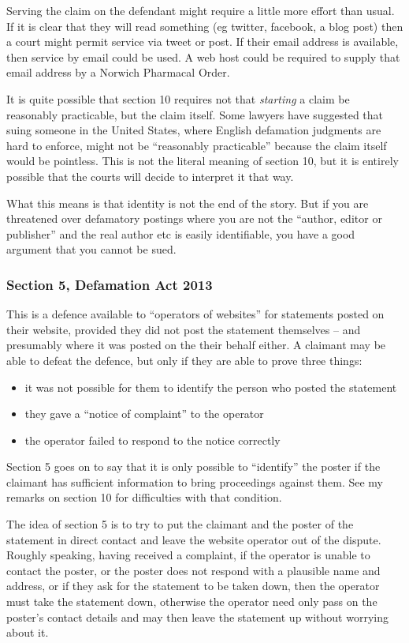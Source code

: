 \documentclass[]{article}
\begin{document}
Serving the claim on the defendant might require a little more effort than usual. If it is clear that they will read something (eg twitter, facebook, a blog post) then a court might permit service via tweet or post. If their email address is available, then service by email could be used. A web host could be required to supply that email address by a Norwich Pharmacal Order.

It is quite possible that section 10 requires not that {\it starting} a claim be reasonably practicable, but the claim itself. Some lawyers have suggested that suing someone in the United States, where English defamation judgments are hard to enforce, might not be ``reasonably practicable'' because the claim itself would be pointless. This is not the literal meaning of section 10, but it is entirely possible that the courts will decide to interpret it that way.

What this means is that identity is not the end of the story. But if you are threatened over defamatory postings where you are not the ``author, editor or publisher'' and the real author etc is easily identifiable, you have a good argument that you cannot be sued.

\subsubsection{Section 5, Defamation Act 2013}
This is a defence available to ``operators of websites'' for statements posted on their website, provided they did not post the statement themselves -- and presumably where it was posted on the their behalf either. A claimant may be able to defeat the defence, but only if they are able to prove three things:

\begin{itemize}
\item it was not possible for them to identify the person who posted the statement
\item they gave a ``notice of complaint'' to the operator
\item the operator failed to respond to the notice correctly
\end{itemize}

Section 5 goes on to say that it is only possible to ``identify'' the poster if the claimant has sufficient information to bring proceedings against them. See my remarks on section 10 for difficulties with that condition.

The idea of section 5 is to try to put the claimant and the poster of the statement in direct contact and leave the website operator out of the dispute. Roughly speaking, having received a complaint, if the operator is unable to contact the poster, or the poster does not respond with a plausible name and address, or if they ask for the statement to be taken down, then the operator must take the statement down, otherwise the operator need only pass on the poster's contact details and may then leave the statement up without worrying about it.
\end{document}
